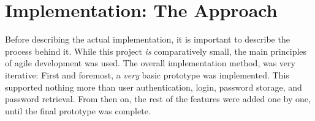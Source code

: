 \chapter{Implementation: The Approach}
	Before describing the actual implementation, it is important to describe the process behind it. While this project \emph{is} comparatively small, the main principles of agile development was used. The overall implementation method, was very iterative: First and foremost, a \emph{very} basic prototype was implemented. This supported nothing more than user authentication, login, password storage, and password retrieval. From then on, the rest of the features were added one by one, until the final prototype was complete.